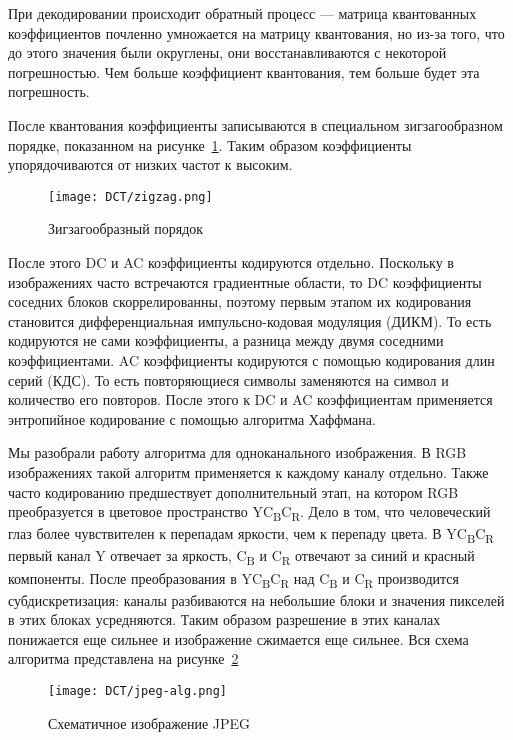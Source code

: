 При декодировании происходит обратный процесс --- матрица квантованных коэффициентов
почленно умножается на матрицу квантования, но из-за того, что до этого значения были округлены,
они восстанавливаются с некоторой погрешностью. Чем больше коэффициент квантования,
тем больше будет эта погрешность.

После квантования коэффициенты записываются в специальном зигзагообразном порядке,
показанном на рисунке~\ref{img:zigzag}. Таким образом коэффициенты упорядочиваются
от низких частот к высоким.
\begin{figure}[ht]
    \centering
    \caption{Зигзагообразный порядок}
    \texttt{[image: DCT/zigzag.png]}
    \label{img:zigzag}
\end{figure}
После этого DC и AC коэффициенты кодируются отдельно.
Поскольку в изображениях часто встречаются
градиентные области, то DC коэффициенты соседних блоков
скоррелированны, поэтому первым этапом их кодирования
становится дифференциальная импульсно-кодовая модуляция (ДИКМ).
То есть кодируются не сами коэффициенты, а разница между двумя
соседними коэффициентами.
AC коэффициенты кодируются с помощью кодирования длин серий (КДС).
То есть повторяющиеся символы заменяются на символ и количество его повторов.
После этого к DC и AC коэффициентам применяется энтропийное кодирование с помощью
алгоритма Хаффмана.

Мы разобрали работу алгоритма для одноканального изображения.
В RGB изображениях такой алгоритм применяется к каждому каналу отдельно.
Также часто кодированию предшествует дополнительный этап,
на котором RGB преобразуется в цветовое пространство
YC\textsubscript{B}C\textsubscript{R}.
Дело в том, что человеческий глаз более чувствителен к перепадам
яркости, чем к перепаду цвета.
В YC\textsubscript{B}C\textsubscript{R} первый канал Y отвечает за яркость,
C\textsubscript{B} и C\textsubscript{R} отвечают за синий и красный компоненты.
После преобразования в YC\textsubscript{B}C\textsubscript{R}
над C\textsubscript{B} и C\textsubscript{R} производится субдискретизация:
каналы разбиваются на небольшие блоки и значения пикселей в этих блоках усредняются.
Таким образом разрешение в этих каналах понижается еще сильнее
и изображение сжимается еще сильнее.
Вся схема алгоритма представлена на рисунке~\ref{img:jpeg-alg}
\begin{figure}[ht]
    \centering
    \caption{Схематичное изображение JPEG}
    \texttt{[image: DCT/jpeg-alg.png]}
    \label{img:jpeg-alg}
\end{figure}

